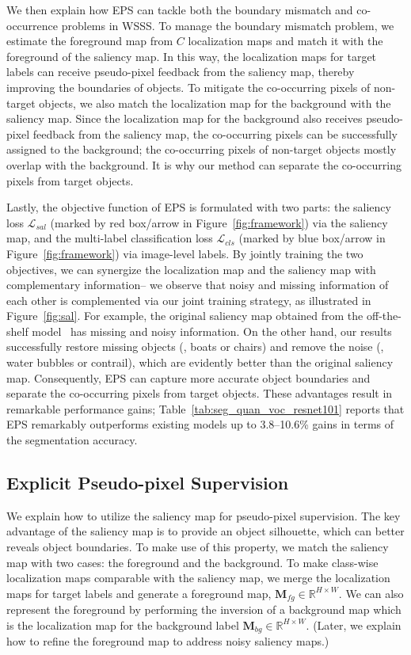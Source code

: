 \documentclass[final]{cvpr}
\begin{document}
We then explain how EPS can tackle both the boundary mismatch and co-occurrence problems in WSSS. To manage the boundary mismatch problem, we estimate the foreground map from $C$ localization maps and match it with the foreground of the saliency map. In this way, the localization maps for target labels can receive pseudo-pixel feedback from the saliency map, thereby improving the boundaries of objects. To mitigate the co-occurring pixels of non-target objects, we also match the localization map for the background with the saliency map. Since the localization map for the background also receives pseudo-pixel feedback from the saliency map, the co-occurring pixels can be successfully assigned to the background; the co-occurring pixels of non-target objects mostly overlap with the background. It is why our method can separate the co-occurring pixels from target objects. 

Lastly, the objective function of EPS is formulated with two parts: {the saliency loss} $\mathcal{L}_{sal}$ (marked by red box/arrow in Figure~\ref{fig:framework}) via the saliency map, and {the multi-label classification loss} $\mathcal{L}_{cls}$ (marked by blue box/arrow in Figure~\ref{fig:framework}) via image-level labels. By jointly training the two objectives, we can synergize the localization map and the saliency map with complementary information-- we observe that noisy and missing information of each other is complemented via our joint training strategy, as illustrated in Figure~\ref{fig:sal}. For example, the original saliency map obtained from the off-the-shelf model~\cite{hou2017deeply,nguyen2019deepusps,zhao2019pyramid} has missing and noisy information. On the other hand, our results successfully restore missing objects (\eg, boats or chairs) and remove the noise (\eg, water bubbles or contrail), which are evidently better than the original saliency map. Consequently, EPS can capture more accurate object boundaries and separate the co-occurring pixels from target objects. These advantages result in remarkable performance gains; Table~\ref{tab:seg_quan_voc_resnet101} reports that EPS remarkably outperforms existing models up to 3.8--10.6\% gains in terms of the segmentation accuracy.


\subsection{Explicit Pseudo-pixel Supervision}\label{section3.2}

We explain how to utilize the saliency map for pseudo-pixel supervision. The key advantage of the saliency map is to provide an object silhouette, which can better reveals object boundaries. To make use of this property, we match the saliency map with two cases: the foreground and the background. To make class-wise localization maps comparable with the saliency map, we merge the localization maps for target labels and generate a foreground map, $\mathbf{M}_{fg} \in \mathbb{R}^{H \times W}$. We can also represent the foreground by performing the inversion of a background map which is the localization map for the background label $\mathbf{M}_{bg} \in \mathbb{R}^{H \times W}$. (Later, we explain how to refine the foreground map to address noisy saliency maps.) 
\end{document}
